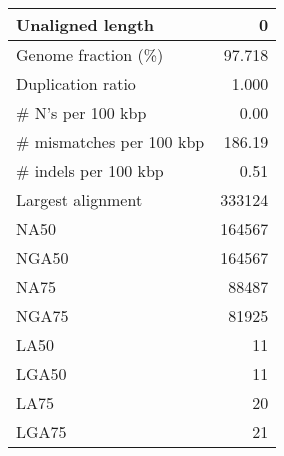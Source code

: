 \documentclass[12pt,a4paper]{article}
\begin{document}
\begin{table}[ht]
\begin{center}
\begin{tabular}{|l*{1}{|r}|}
Unaligned length & 0 \\ \hline
Genome fraction (\%) & 97.718 \\ \hline
Duplication ratio & 1.000 \\ \hline
\# N's per 100 kbp & 0.00 \\ \hline
\# mismatches per 100 kbp & 186.19 \\ \hline
\# indels per 100 kbp & 0.51 \\ \hline
Largest alignment & 333124 \\ \hline
NA50 & 164567 \\ \hline
NGA50 & 164567 \\ \hline
NA75 & 88487 \\ \hline
NGA75 & 81925 \\ \hline
LA50 & 11 \\ \hline
LGA50 & 11 \\ \hline
LA75 & 20 \\ \hline
LGA75 & 21 \\ \hline
\end{tabular}
\end{center}
\end{table}
\end{document}
